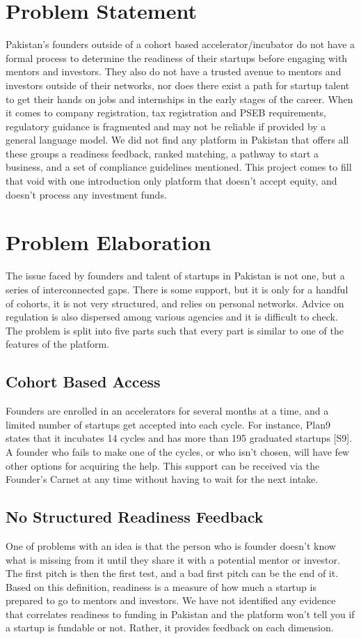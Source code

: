 \documentclass{FastFyp}
\newcommand{\src}[1]{[#1]}
\begin{document}
\section{Problem Statement}
Pakistan's founders outside of a cohort based accelerator/incubator do not have a formal process to determine the readiness of their startups before engaging with mentors and investors. They also do not have a trusted avenue to mentors and investors outside of their networks, nor does there exist a path for startup talent to get their hands on jobs and internships in the early stages of the career. When it comes to company registration, tax registration and PSEB requirements, regulatory guidance is fragmented and may not be reliable if provided by a general language model. We did not find any platform in Pakistan that offers all these groups a readiness feedback, ranked matching, a pathway to start a business, and a set of compliance guidelines mentioned. This project comes to fill that void with one introduction only platform that doesn't accept equity, and doesn't process any investment funds.

\section{Problem Elaboration}
The issue faced by founders and talent of startups in Pakistan is not one, but a series of interconnected gaps. There is some support, but it is only for a handful of cohorts, it is not very structured, and relies on personal networks. Advice on regulation is also dispersed among various agencies and it is difficult to check. The problem is split into five parts such that every part is similar to one of the features of the platform.

\subsection{Cohort Based Access}
Founders are enrolled in an accelerators for several months at a time, and a limited number of startups get accepted into each cycle. For instance, Plan9 states that it incubates 14 cycles and has more than 195 graduated startups \src{S9}. A founder who fails to make one of the cycles, or who isn't chosen, will have few other options for acquiring the help. This support can be received via the Founder's Carnet at any time without having to wait for the next intake.

\subsection{No Structured Readiness Feedback}
One of problems with an idea is that the person who is founder doesn't know what is missing from it until they share it with a potential mentor or investor. The first pitch is then the first test, and a bad first pitch can be the end of it. Based on this definition, readiness is a measure of how much a startup is prepared to go to mentors and investors. We have not identified any evidence that correlates readiness to funding in Pakistan and the platform won't tell you if a startup is fundable or not. Rather, it provides feedback on each dimension.
\end{document}

